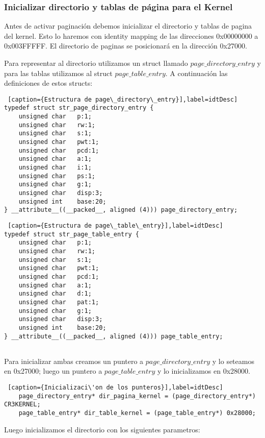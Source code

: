 \subsubsection*{Inicializar directorio y tablas de p\'agina para el Kernel}
\par{Antes de activar paginaci\'on debemos inicializar el directorio y tablas de pagina del kernel.
Esto lo haremos con identity mapping de las direcciones 0x00000000 a 0x003FFFFF. El directorio de paginas se posicionar\'a en la direcci\'on 0x27000.}

\par{Para representar al directorio utilizamos un struct llamado $page\_directory\_entry$ y para las tablas utilizamos al struct $page\_table\_entry$. A continuaci\'on las definiciones de estos structs:}

\begin{lstlisting} [caption={Estructura de page\_directory\_entry}],label=idtDesc] 
typedef struct str_page_directory_entry {
    unsigned char   p:1;
    unsigned char   rw:1;
    unsigned char   s:1;
    unsigned char   pwt:1;
    unsigned char   pcd:1;
    unsigned char   a:1;
    unsigned char   i:1;
    unsigned char   ps:1;
    unsigned char   g:1;
    unsigned char   disp:3;
    unsigned int    base:20;
} __attribute__((__packed__, aligned (4))) page_directory_entry;

\end{lstlisting}

\begin{lstlisting} [caption={Estructura de page\_table\_entry}],label=idtDesc] 
typedef struct str_page_table_entry {
    unsigned char   p:1;
    unsigned char   rw:1;
    unsigned char   s:1;
    unsigned char   pwt:1;
    unsigned char   pcd:1;
    unsigned char   a:1;
    unsigned char   d:1;
    unsigned char   pat:1;
    unsigned char   g:1;
    unsigned char   disp:3;
    unsigned int    base:20;
} __attribute__((__packed__, aligned (4))) page_table_entry;


\end{lstlisting}


\newpage
\par{Para inicializar ambas creamos un puntero a $page\_directory\_entry$ y lo seteamos en 0x27000; luego un puntero a $page\_table\_entry$ y lo inicializamos en 0x28000.}

\begin{lstlisting} [caption={Inicializaci\'on de los punteros}],label=idtDesc] 
	page_directory_entry* dir_pagina_kernel = (page_directory_entry*) CR3KERNEL;
	page_table_entry* dir_table_kernel = (page_table_entry*) 0x28000;
\end{lstlisting}
\par{Luego inicializamos el directorio con los siguientes parametros:}

